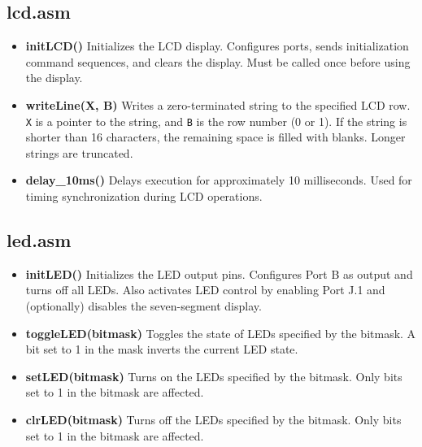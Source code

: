 \documentclass[a4paper,12pt]{article}
\begin{document}

\subsection{lcd.asm}
\begin{itemize}
    \item \textbf{initLCD()}  
    Initializes the LCD display. Configures ports, sends initialization command sequences, and clears the display. Must be called once before using the display.

    \item \textbf{writeLine(X, B)}  
    Writes a zero-terminated string to the specified LCD row.  
    \texttt{X} is a pointer to the string, and \texttt{B} is the row number (0 or 1).  
    If the string is shorter than 16 characters, the remaining space is filled with blanks. Longer strings are truncated.

    \item \textbf{delay\_10ms()}  
    Delays execution for approximately 10 milliseconds. Used for timing synchronization during LCD operations.
\end{itemize}



\subsection{led.asm}
\begin{itemize}
    \item \textbf{initLED()}  
    Initializes the LED output pins. Configures Port B as output and turns off all LEDs. Also activates LED control by enabling Port J.1 and (optionally) disables the seven-segment display.

    \item \textbf{toggleLED(bitmask)}  
    Toggles the state of LEDs specified by the bitmask. A bit set to 1 in the mask inverts the current LED state.

    \item \textbf{setLED(bitmask)}  
    Turns on the LEDs specified by the bitmask. Only bits set to 1 in the bitmask are affected.

    \item \textbf{clrLED(bitmask)}  
    Turns off the LEDs specified by the bitmask. Only bits set to 1 in the bitmask are affected.
\end{itemize}
\end{document}
